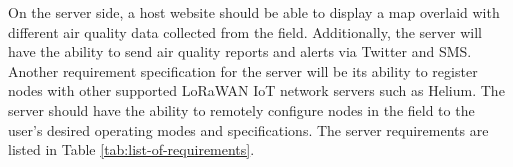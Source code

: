 On the server side, a host website should be able to display a map overlaid with different air quality data collected from the field. Additionally, the server will have the ability to send air quality reports and alerts via Twitter and SMS. Another requirement specification for the server will be its ability to register nodes with other supported LoRaWAN IoT network servers such as Helium. The server should have the ability to remotely configure nodes in the field to the user's desired operating modes and specifications. The server requirements are listed in Table \ref{tab:list-of-requirements}.




